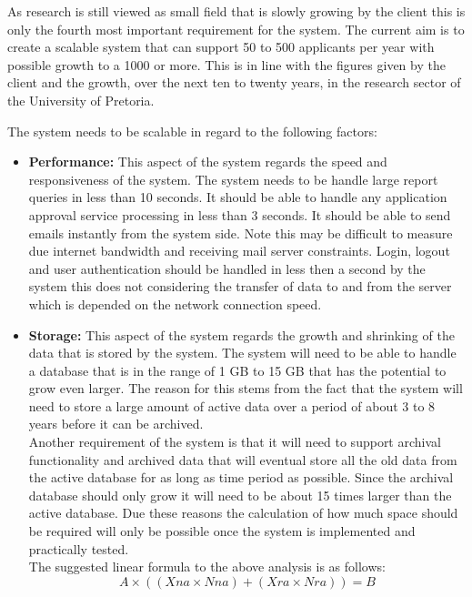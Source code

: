 \begin{flushleft}

As research is still viewed as small field that is slowly growing by the client this is only the fourth most important requirement for the system. The current aim is to create a scalable system that can support 50 to 500 applicants per year with possible growth to a 1000 or more. This is in line with the figures given by the client and the growth, over the next ten to twenty years, in the research sector of the University of Pretoria.\\
\vspace{0.05in}

The system needs to be scalable in regard to the following factors:
\begin{itemize}

\item\textbf{Performance:} This aspect of the system regards the speed and responsiveness of the system.
The system needs to be handle large report queries in less than 10 seconds. It should be able to handle any application approval service processing in less than 3 seconds. It should be able to send emails instantly from the system side. Note this may be difficult to measure due internet bandwidth and receiving mail server constraints. Login, logout and user authentication should be handled in less then a second by the system this does not  considering the transfer of data to and from the server which is depended on the network connection speed.\\

\item\textbf{Storage:} This aspect of the system regards the growth and shrinking of the data that is stored by the system.
The system will need to be able to handle a database that is in the range of 1 GB to 15 GB that has the potential to grow even larger. The reason for this stems from the fact that the system will need to store a large amount of active data over a period of about 3 to 8 years before it can be archived.
\\Another requirement of the system is that it will need to support archival functionality and archived data that will eventual store all the old data from the active database for as long as time period as possible. Since the archival database should only grow it will need to be about 15 times larger than the active database. Due these reasons the calculation of how much space should be required will only be possible once the system is implemented and practically tested.\\The suggested linear formula to the above analysis is as follows: 
\begin{equation}
A \times ( (Xna \times Nna) + (Xra \times Nra) ) = B
\end{equation}


\end{itemize}
\end{flushleft}

